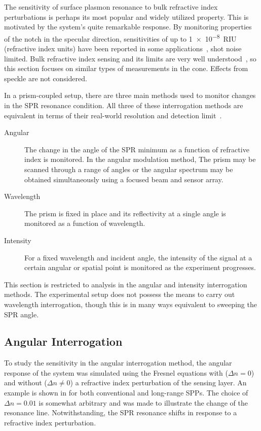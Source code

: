 The sensitivity of surface plasmon resonance to bulk refractive index
perturbations is perhaps its most popular and widely utilized property.
This is motivated by the system's quite remarkable response. By monitoring
properties of the notch in the specular direction, sensitivities of up to
\SI{1e-8}{RIU} (refractive index units) have been reported in some
applications~\cite{fan2008sensitive}, shot noise limited.  Bulk refractive
index sensing and its limits are very well
understood~\cite{piliarik2009surface}, so this section focuses on similar
types of measurements in the cone.  Effects from speckle are not considered.

In a prism-coupled setup, there are three main methods used to monitor changes
in the SPR resonance condition.  All three of these interrogation methods are
equivalent in terms of their real-world resolution and detection
limit~\cite{homola2006surface}.
\begin{description}
	\item [{Angular}] The change in the angle of the SPR minimum as a function
					of refractive index is monitored.  In the angular modulation method,
					The prism may be scanned through a range of angles or the angular
					spectrum may be obtained simultaneously using a focused beam and
					sensor array.
 \item [{Wavelength}] The prism is fixed in place and its reflectivity at
  a single angle is monitored as a function of wavelength.
	\item [{Intensity}] For a fixed wavelength and incident angle, the
		intensity of the signal at a certain angular or spatial point is
		monitored as the experiment progresses.
\end{description}
This section is restricted to analysis in the angular and intensity
interrogation methods.  The experimental setup does not possess the means to
carry out wavelength interrogation, though this is in many ways equivalent to
sweeping the SPR angle. 

\subsection{Angular Interrogation}
To study the sensitivity in the angular interrogation method, the angular
response of the system was simulated using the Fresnel equations with ($\Delta
n = 0$) and without ($\Delta n \ne 0$) a refractive index perturbation of the
sensing layer.  An example is shown in  for both
conventional and long-range SPPs.  The choice of $\Delta n = 0.01$ is somewhat
arbitrary and was made to illustrate the change of the resonance line.
Notwithstanding, the SPR resonance shifts in response to a refractive index
perturbation.

